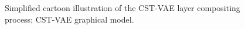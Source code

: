 \label{sec:models}\vspace{-3mm}






\begin{figure}[t]
\begin{center}
\qquad\qquad\qquad
{}\vspace{-3mm}
\end{center}
 \caption{\footnotesize {} Simplified cartoon illustration of the CST-VAE layer compositing process; 
  CST-VAE graphical model.  
 }
\end{figure}



